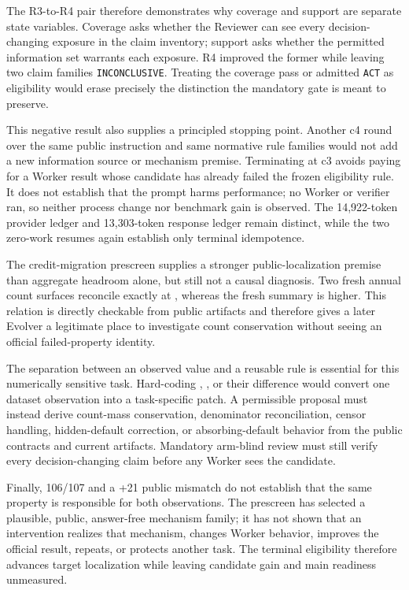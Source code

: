 The R3-to-R4 pair therefore demonstrates why coverage and support are separate
state variables. Coverage asks whether the Reviewer can see every
decision-changing exposure in the claim inventory; support asks whether the
permitted information set warrants each exposure. R4 improved the former while
leaving two claim families \texttt{INCONCLUSIVE}. Treating the coverage pass or
admitted \texttt{ACT} as eligibility would erase precisely the distinction the
mandatory gate is meant to preserve.

This negative result also supplies a principled stopping point. Another c4
round over the same public instruction and same normative rule families would
not add a new information source or mechanism premise. Terminating at c3 avoids
paying for a Worker result whose candidate has already failed the frozen
eligibility rule. It does not establish that the prompt harms performance; no
Worker or verifier ran, so neither process change nor benchmark gain is
observed. The 14,922-token provider ledger and 13,303-token response ledger
remain distinct, while the two zero-work resumes again establish only terminal
idempotence.

The credit-migration prescreen supplies a stronger public-localization premise
than aggregate headroom alone, but still not a causal diagnosis. Two fresh
annual count surfaces reconcile exactly at
\CreditMigrationHZeroCohortMass{}, whereas the fresh summary is
\CreditMigrationHZeroMassGap{} higher. This relation is directly checkable
from public artifacts and therefore gives a later Evolver a legitimate place
to investigate count conservation without seeing an official failed-property
identity.

The separation between an observed value and a reusable rule is essential for
this numerically sensitive task. Hard-coding \CreditMigrationHZeroCohortMass{},
\CreditMigrationHZeroSummaryMass{}, or their difference would convert one
dataset observation into a task-specific patch. A permissible proposal must
instead derive count-mass conservation, denominator reconciliation, censor
handling, hidden-default correction, or absorbing-default behavior from the
public contracts and current artifacts. Mandatory arm-blind review must still
verify every decision-changing claim before any Worker sees the candidate.

Finally, 106/107 and a +21 public mismatch do not establish that the same
property is responsible for both observations. The prescreen has selected a
plausible, public, answer-free mechanism family; it has not shown that an
intervention realizes that mechanism, changes Worker behavior, improves the
official result, repeats, or protects another task. The terminal eligibility
therefore advances target localization while leaving candidate gain and main
readiness unmeasured.

